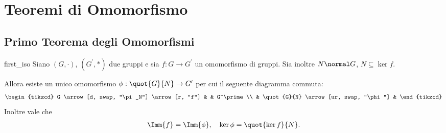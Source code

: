\section{Teoremi di Omomorfismo}

\subsection{Primo Teorema degli Omomorfismi}
\begin{theorem}
     {first_iso}
    Siano $(G, \cdot)$, $(G^\prime, *)$ due gruppi e sia $f : G \to G^\prime$ un omomorfismo di gruppi. Sia inoltre $N \normal G$, $N \subseteq \ker f$.

    Allora esiste un unico omomorfismo $\phi : \quot{G}{N} \to G^\prime$ per cui il seguente diagramma commuta:
    \begin{equation}
        \begin{tikzcd}
            G \arrow[d, swap, "\pi_N"] \arrow[r, "f"] & & G^\prime \\
            & \quot{G}{N} \arrow[ur, swap, "\phi"] &
        \end{tikzcd}
    \end{equation}
    Inoltre vale che \begin{align*}
        \Imm{f} = \Imm{\phi}, \quad \ker \phi = \quot{\ker f}{N}.
    \end{align*}
\end{theorem}
